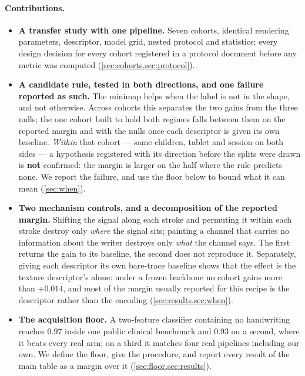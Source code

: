 \documentclass[10pt,a4paper]{article}
\begin{document}
\paragraph{Contributions.}
\begin{itemize}
\itemsep0em
\item \textbf{A transfer study with one pipeline.} Seven cohorts, identical rendering parameters,
descriptor, model grid, nested protocol and statistics; every design decision for every cohort
registered in a protocol document before any metric was computed
(\cref{sec:cohorts,sec:protocol}).

\item \textbf{A candidate rule, tested in both directions, and one failure reported as such.} The
minimap helps when the label is not in the shape, and not otherwise. Across cohorts this separates
the two gains from the three nulls; the one cohort built to hold both regimes falls between them on
the reported margin and with the nulls once each descriptor is given its own baseline.
\emph{Within} that cohort --- same children, tablet and session on both sides --- a
hypothesis registered with its direction before the splits were drawn is \textbf{not} confirmed:
the margin is larger on the half where the rule predicts none. We report the failure, and use the
floor below to bound what it can mean (\cref{sec:when}).

\item \textbf{Two mechanism controls, and a decomposition of the reported margin.} Shifting the
signal along each stroke and permuting it within each stroke destroy only \emph{where} the signal
sits; painting a channel that carries no information about the writer destroys only \emph{what} the
channel says. The first returns the gain to its baseline, the second does not reproduce it.
Separately, giving each descriptor its
own bare-trace baseline shows that the effect is the texture descriptor's alone: under a frozen
backbone no cohort gains more than $+0.014$, and most of the margin usually reported for this
recipe is the descriptor rather than the encoding (\cref{sec:results,sec:when}).

\item \textbf{The acquisition floor.} A two-feature classifier containing no handwriting reaches
$0.97$ inside one public clinical benchmark and $0.93$ on a second, where it beats every real arm;
on a third it matches four real pipelines including our own. We define the floor, give the
procedure, and report every result of the main table as a margin over it
(\cref{sec:floor,sec:results}).
\end{itemize}
\end{document}

